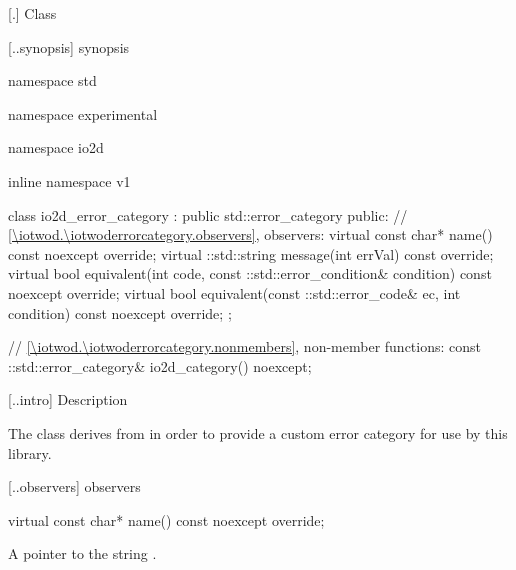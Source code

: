  [\iotwod.\iotwoderrorcategory] {Class }

 [\iotwod.\iotwoderrorcategory.synopsis] { 
synopsis}

\begin{codeblock}
namespace std { namespace experimental { namespace io2d { inline namespace v1 {
  class io2d_error_category : public std::error_category {
  public:
    // \ref{\iotwod.\iotwoderrorcategory.observers}, observers:
    virtual const char* name() const noexcept override;
    virtual ::std::string message(int errVal) const override;
    virtual bool equivalent(int code,
      const ::std::error_condition& condition) const noexcept override;
    virtual bool equivalent(const ::std::error_code& ec,
      int condition) const noexcept override;
  };
  
  // \ref{\iotwod.\iotwoderrorcategory.nonmembers}, non-member functions:
  const ::std::error_category& io2d_category() noexcept;
} } } }
\end{codeblock}

 [\iotwod.\iotwoderrorcategory.intro] { 
Description}

\pnum
{}
The  class derives from 
 in order to provide a custom error category for 
use by this library.

 [\iotwod.\iotwoderrorcategory.observers] { 
observers}

\begin{itemdecl}
virtual const char* name() const noexcept override;
\end{itemdecl}
\begin{itemdescr}
	\pnum
	\returns
	A pointer to the string .
\end{itemdescr}

